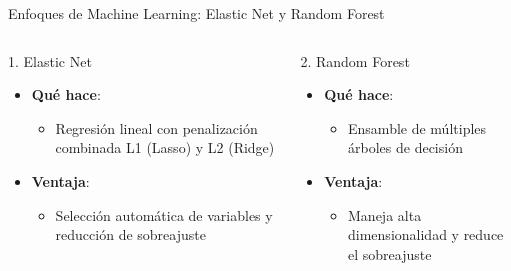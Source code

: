 \begin{frame}{Enfoques de Machine Learning: Elastic Net y Random Forest}
    \begin{columns}[T]
        \begin{column}{0.48\textwidth}
            \begin{alertblock}{1. Elastic Net}
                \begin{itemize}
                    
                    \item \textbf{Qué hace}: 
                    \begin{itemize}
                        
                        \item Regresión lineal con penalización combinada L1 (Lasso) y L2 (Ridge)
                    \end{itemize}
                    \item \textbf{Ventaja}: 
                    \begin{itemize}
                        
                        \item Selección automática de variables y reducción de sobreajuste
                    \end{itemize}
                \end{itemize}
            \end{alertblock}
        \end{column}
        
        \begin{column}{0.48\textwidth}
            \begin{alertblock}{2. Random Forest}
                \begin{itemize}
                    
                    \item \textbf{Qué hace}: 
                    \begin{itemize}
                        
                        \item Ensamble de múltiples árboles de decisión
                    \end{itemize}
                    \item \textbf{Ventaja}: 
                    \begin{itemize}
                        
                        \item Maneja alta dimensionalidad y reduce el sobreajuste
                    \end{itemize}
                \end{itemize}
            \end{alertblock}
        \end{column}
    \end{columns}
\end{frame}

